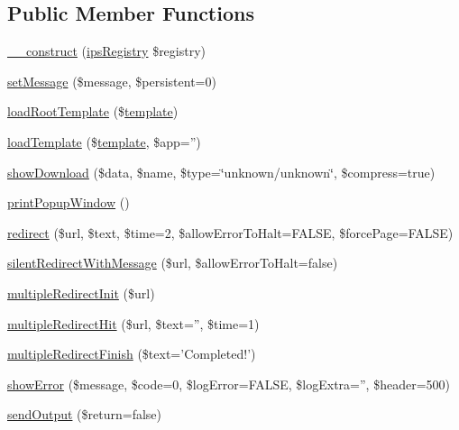\subsection*{Public Member Functions}
\begin{DoxyCompactItemize}
\item 
\hyperlink{classadmin_output_a178c3a93e57e75dd87a5d39112af0b07}{\-\_\-\-\_\-construct} (\hyperlink{classips_registry}{ips\-Registry} \$registry)
\item 
\hyperlink{classadmin_output_aee06a81c43dcda7412a06dd2d6b1773e}{set\-Message} (\$message, \$persistent=0)
\item 
\hyperlink{classadmin_output_afb5da7b1db3cc7e4f97b8b9cce9ccb44}{load\-Root\-Template} (\$\hyperlink{classoutput_a0b54c9d3801b331b75487ef78d98c06b}{template})
\item 
\hyperlink{classadmin_output_a4f98a622c7a96a9abbf065e1a3c02477}{load\-Template} (\$\hyperlink{classoutput_a0b54c9d3801b331b75487ef78d98c06b}{template}, \$app='')
\item 
\hyperlink{classadmin_output_ae6e4f228eaee437d7411d164417d24c1}{show\-Download} (\$data, \$name, \$type=\char`\"{}unknown/unknown\char`\"{}, \$compress=true)
\item 
\hyperlink{classadmin_output_acc16fde47f5b8de4763968e23e73bdc4}{print\-Popup\-Window} ()
\item 
\hyperlink{classadmin_output_ac9934ccaa0bf8f6f0b2d8d5c58d0b5b9}{redirect} (\$url, \$text, \$time=2, \$allow\-Error\-To\-Halt=F\-A\-L\-S\-E, \$force\-Page=F\-A\-L\-S\-E)
\item 
\hyperlink{classadmin_output_a9c09b4958fd21a4c3888c1e1e919f709}{silent\-Redirect\-With\-Message} (\$url, \$allow\-Error\-To\-Halt=false)
\item 
\hyperlink{classadmin_output_aebd2d564d9d3effe8d44620919cf1938}{multiple\-Redirect\-Init} (\$url)
\item 
\hyperlink{classadmin_output_a3b9ee2f7e16bb42634ae55886d3a060d}{multiple\-Redirect\-Hit} (\$url, \$text='', \$time=1)
\item 
\hyperlink{classadmin_output_a6f7eddb747aa127fa78b57a9f4b9ef0e}{multiple\-Redirect\-Finish} (\$text='Completed!')
\item 
\hyperlink{classadmin_output_a27ca271ae1c1c0a652d1cf894de337ad}{show\-Error} (\$message, \$code=0, \$log\-Error=F\-A\-L\-S\-E, \$log\-Extra='', \$header=500)
\item 
\hyperlink{classadmin_output_abbdb824a3f45b51c7c1c38bea393350b}{send\-Output} (\$return=false)
\item 

\end{DoxyCompactItemize}
